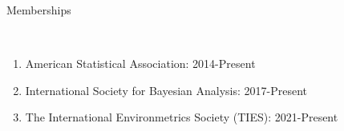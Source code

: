 \documentclass[11pt]{article}
\newcommand{\head}[1]{ %
    \bigskip %
    \begin{large}\begin{bf}{#1}\end{bf}\end{large} %

    \ \\ [-1.3cm] %

    \hrulefill}
\begin{document}
\head{Memberships}

\begin{enumerate}[label=$\bullet$]
\item American Statistical Association: 2014-Present
\item International Society for Bayesian Analysis: 2017-Present
\item The International Environmetrics Society (TIES): 2021-Present
\end{enumerate}



\end{document}
